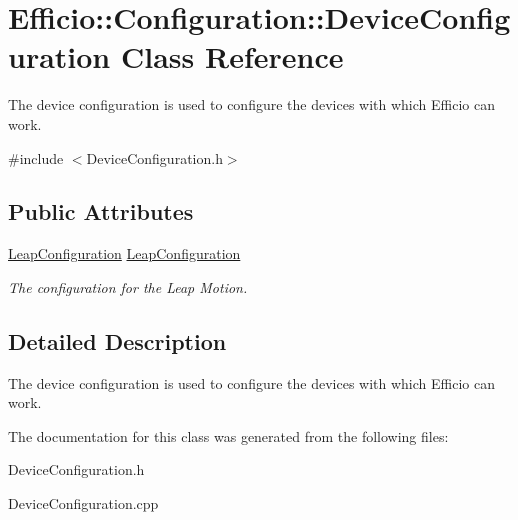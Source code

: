 \hypertarget{class_efficio_1_1_configuration_1_1_device_configuration}{}\section{Efficio\+:\+:Configuration\+:\+:Device\+Configuration Class Reference}
\label{class_efficio_1_1_configuration_1_1_device_configuration}


The device configuration is used to configure the devices with which Efficio can work.  




{\ttfamily \#include $<$Device\+Configuration.\+h$>$}

\subsection*{Public Attributes}
\begin{DoxyCompactItemize}
\item 
\hypertarget{class_efficio_1_1_configuration_1_1_device_configuration_aa5c43ffa75c5483880a21ef3490b54d6}{}\label{class_efficio_1_1_configuration_1_1_device_configuration_aa5c43ffa75c5483880a21ef3490b54d6} 
\hyperlink{class_efficio_1_1_configuration_1_1_leap_configuration}{Leap\+Configuration} \hyperlink{class_efficio_1_1_configuration_1_1_device_configuration_aa5c43ffa75c5483880a21ef3490b54d6}{Leap\+Configuration}
\begin{DoxyCompactList}\small\item\em The configuration for the Leap Motion. \end{DoxyCompactList}\end{DoxyCompactItemize}


\subsection{Detailed Description}
The device configuration is used to configure the devices with which Efficio can work. 

The documentation for this class was generated from the following files\+:\begin{DoxyCompactItemize}
\item 
Device\+Configuration.\+h\item 
Device\+Configuration.\+cpp\end{DoxyCompactItemize}
